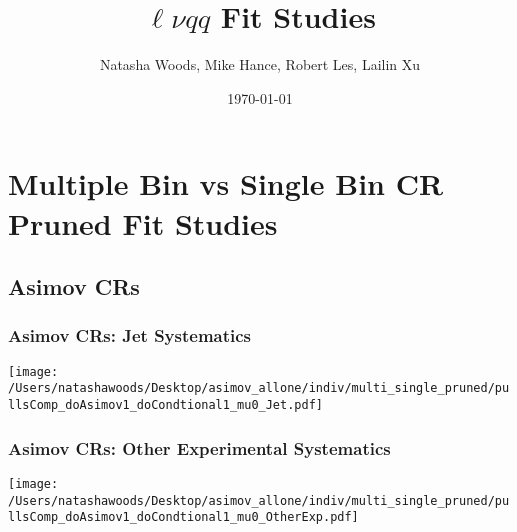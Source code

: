 \documentclass{beamer}
\title[$\ell\nu qq$ Fit Studies]{$\ell\nu qq$ Fit Studies} %
\author[Natasha Woods]{Natasha Woods, Mike Hance, Robert Les, Lailin Xu} %
\date{\today} %
\begin{document}
\begin{frame}
\titlepage %
\end{frame}

\begin{frame}
\tableofcontents
\end{frame}



\section{Multiple Bin vs Single Bin CR Pruned Fit Studies} %

\subsection{Asimov CRs} %
\begin{frame}
\frametitle{Asimov CRs: Jet Systematics}
       \texttt{[image: /Users/natashawoods/Desktop/asimov\_allone/indiv/multi\_single\_pruned/pullsComp\_doAsimov1\_doCondtional1\_mu0\_Jet.pdf]}
\end{frame}

\begin{frame}
\frametitle{Asimov CRs: Other Experimental Systematics}
       \texttt{[image: /Users/natashawoods/Desktop/asimov\_allone/indiv/multi\_single\_pruned/pullsComp\_doAsimov1\_doCondtional1\_mu0\_OtherExp.pdf]}
\end{frame}
\end{document}
